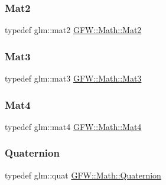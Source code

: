 \subsubsection{\texorpdfstring{Mat2}{Mat2}}
{\footnotesize\ttfamily typedef glm\+::mat2 \hyperlink{namespace_g_f_w_1_1_math_a84c8cb525c3c8be2c572eaf2839d76a2}{G\+F\+W\+::\+Math\+::\+Mat2}}

\mbox{\label{namespace_g_f_w_1_1_math_ab5dfc77d541d85c8e2a42f6e645fba70}} 
\subsubsection{\texorpdfstring{Mat3}{Mat3}}
{\footnotesize\ttfamily typedef glm\+::mat3 \hyperlink{namespace_g_f_w_1_1_math_ab5dfc77d541d85c8e2a42f6e645fba70}{G\+F\+W\+::\+Math\+::\+Mat3}}

\mbox{\label{namespace_g_f_w_1_1_math_a313d630ab7d0ef3b109bb39401962fb1}} 
\subsubsection{\texorpdfstring{Mat4}{Mat4}}
{\footnotesize\ttfamily typedef glm\+::mat4 \hyperlink{namespace_g_f_w_1_1_math_a313d630ab7d0ef3b109bb39401962fb1}{G\+F\+W\+::\+Math\+::\+Mat4}}

\mbox{\label{namespace_g_f_w_1_1_math_ae0c2a9f7efcd94286b950a2ddea66ee0}} 
\subsubsection{\texorpdfstring{Quaternion}{Quaternion}}
{\footnotesize\ttfamily typedef glm\+::quat \hyperlink{namespace_g_f_w_1_1_math_ae0c2a9f7efcd94286b950a2ddea66ee0}{G\+F\+W\+::\+Math\+::\+Quaternion}}

\mbox{\label{namespace_g_f_w_1_1_math_a804f4544e7f9f1d56cf67b5669922699}} 
